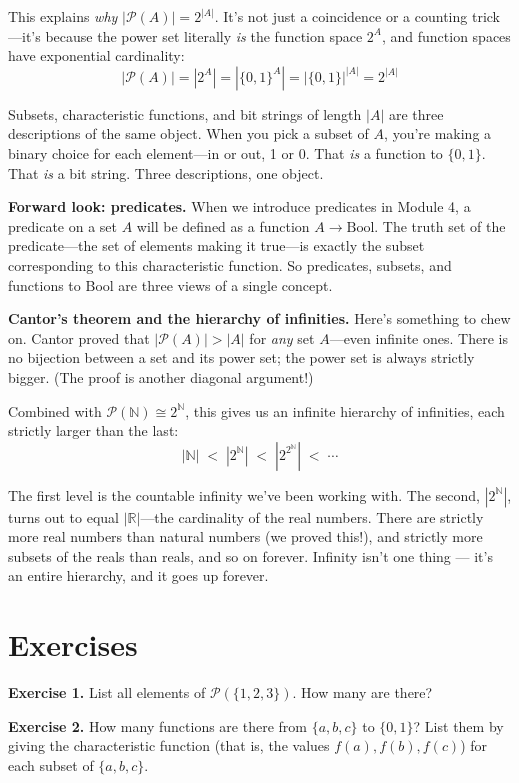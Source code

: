 \documentclass[11pt]{article}
\begin{document}
This explains \emph{why} $|\mathcal{P}(A)| = 2^{|A|}$. It's not just a coincidence or a counting trick---it's because the power set literally \emph{is} the function space $2^A$, and function spaces have exponential cardinality:
\[
|\mathcal{P}(A)| = |2^A| = |\{0,1\}^A| = |\{0,1\}|^{|A|} = 2^{|A|}
\]

Subsets, characteristic functions, and bit strings of length $|A|$ are three descriptions of the same object. When you pick a subset of $A$, you're making a binary choice for each element---in or out, 1 or 0. That \emph{is} a function to $\{0,1\}$. That \emph{is} a bit string. Three descriptions, one object.

\medskip
\noindent\textbf{Forward look: predicates.} When we introduce predicates in Module 4, a predicate on a set $A$ will be defined as a function $A \to \text{Bool}$. The truth set of the predicate---the set of elements making it true---is exactly the subset corresponding to this characteristic function. So predicates, subsets, and functions to Bool are three views of a single concept.

\medskip
\noindent\textbf{Cantor's theorem and the hierarchy of infinities.} Here's something to chew on. Cantor proved that $|\mathcal{P}(A)| > |A|$ for \emph{any} set $A$---even infinite ones. There is no bijection between a set and its power set; the power set is always strictly bigger. (The proof is another diagonal argument!)

Combined with $\mathcal{P}(\mathbb{N}) \cong 2^{\mathbb{N}}$, this gives us an infinite hierarchy of infinities, each strictly larger than the last:
\[
|\mathbb{N}| \;<\; |2^{\mathbb{N}}| \;<\; |2^{2^{\mathbb{N}}}| \;<\; \cdots
\]

The first level is the countable infinity we've been working with. The second, $|2^{\mathbb{N}}|$, turns out to equal $|\mathbb{R}|$---the cardinality of the real numbers. There are strictly more real numbers than natural numbers (we proved this!), and strictly more subsets of the reals than reals, and so on forever. Infinity isn't one thing --- it's an entire hierarchy, and it goes up forever.

\section{Exercises}

\bigskip
\textbf{Exercise 1.}\label{ex:m1b:1} List all elements of $\mathcal{P}(\{1, 2, 3\})$. How many are there?

\bigskip
\textbf{Exercise 2.}\label{ex:m1b:2} How many functions are there from $\{a, b, c\}$ to $\{0, 1\}$? List them by giving the characteristic function (that is, the values $f(a), f(b), f(c)$) for each subset of $\{a, b, c\}$.
\end{document}

